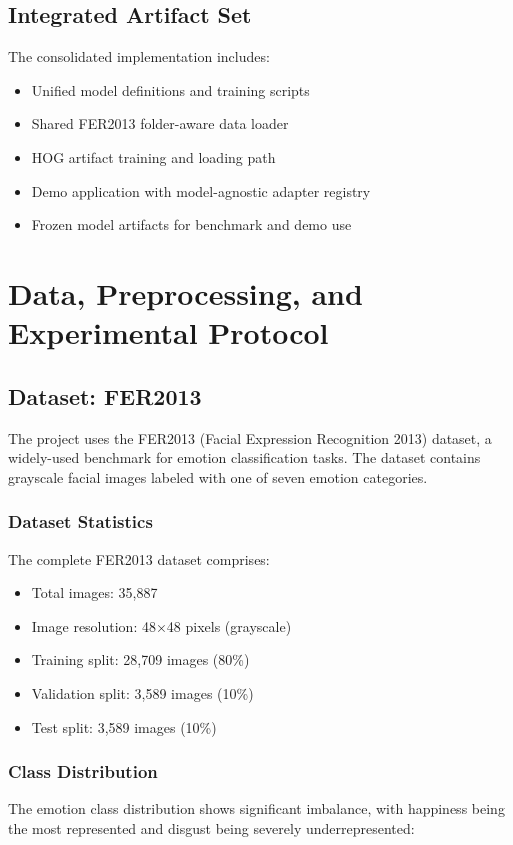 \documentclass[12pt,a4paper]{article}
\begin{document}
\subsection{Integrated Artifact Set}
The consolidated implementation includes:
\begin{itemize}[leftmargin=*]
    \item Unified model definitions and training scripts
    \item Shared FER2013 folder-aware data loader
    \item HOG artifact training and loading path
    \item Demo application with model-agnostic adapter registry
    \item Frozen model artifacts for benchmark and demo use
\end{itemize}

\section{Data, Preprocessing, and Experimental Protocol}

\subsection{Dataset: FER2013}
The project uses the FER2013 (Facial Expression Recognition 2013) dataset, a widely-used benchmark for emotion classification tasks. The dataset contains grayscale facial images labeled with one of seven emotion categories.

\subsubsection{Dataset Statistics}
The complete FER2013 dataset comprises:
\begin{itemize}[leftmargin=*]
    \item Total images: 35,887
    \item Image resolution: 48×48 pixels (grayscale)
    \item Training split: 28,709 images (80\%)
    \item Validation split: 3,589 images (10\%)
    \item Test split: 3,589 images (10\%)
\end{itemize}

\subsubsection{Class Distribution}
The emotion class distribution shows significant imbalance, with happiness being the most represented and disgust being severely underrepresented:
\end{document}
